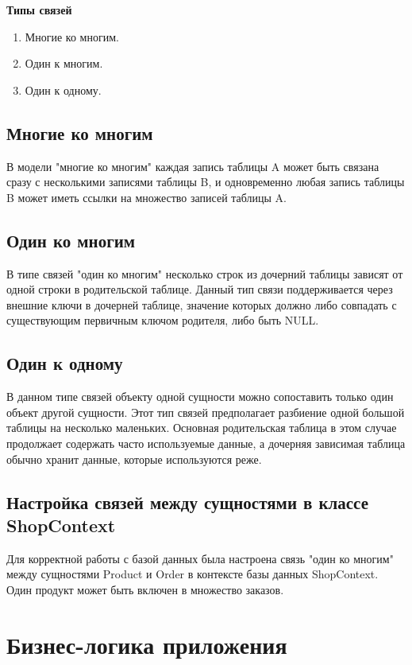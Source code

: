 \documentclass[a4paper,12pt]{report}
\begin{document}
\textbf{Типы связей}
\begin{enumerate}
    \item
        Многие ко многим.
    \item
        Один к многим.
    \item
        Один к одному.
\end{enumerate}

\subsection{Многие ко многим}

В модели "многие ко многим" каждая запись таблицы A может быть связана сразу с несколькими записями таблицы B, 
и одновременно любая запись таблицы B может иметь ссылки на множество записей таблицы A.

\subsection{Один ко многим}

В типе связей "один ко многим" несколько строк из дочерний таблицы зависят от одной строки в родительской таблице.
Данный тип связи поддерживается через внешние ключи в дочерней таблице, значение которых должно либо совпадать 
с существующим первичным ключом родителя, либо быть NULL.

\subsection{Один к одному}

В данном типе связей объекту одной сущности можно сопоставить только один объект другой сущности.
Этот тип связей предполагает разбиение одной большой таблицы на несколько маленьких. 
Основная родительская таблица в этом случае продолжает содержать часто используемые данные, 
а дочерняя зависимая таблица обычно хранит данные, которые используются реже.

\subsection{Настройка связей между сущностями в классе ShopContext}

Для корректной работы с базой данных была настроена связь "один ко многим" между сущностями Product и Order 
в контексте базы данных ShopContext. Один продукт может быть включен в множество заказов.

\section{Бизнес-логика приложения}
\end{document}

